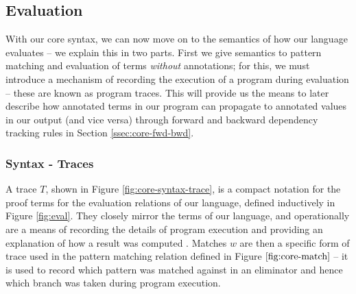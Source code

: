 \subsection{Evaluation}

With our core syntax, we can now move on to the semantics of how our language evaluates -- we explain this in two parts. First we give semantics to pattern matching and evaluation of terms \textit{without} annotations; for this, we must introduce a mechanism of recording the execution of a program during evaluation -- these are known as program traces. This will provide us the means to later describe how annotated terms in our program can propagate to annotated values in our output (and vice versa) through forward and backward dependency tracking rules in Section \ref{ssec:core-fwd-bwd}.

\subsubsection{Syntax - Traces}
\label{ssec:core-syntax-trace}



A trace $T$, shown in Figure \ref{fig:core-syntax-trace}, is a compact notation for the proof terms for the evaluation relations of our language, defined inductively in Figure \ref{fig:eval}. 
They closely mirror the terms of our language, and operationally are a means of recording the details of program execution and providing an explanation of how a result was computed \cite{perera12a}. Matches $w$ are then a specific form of trace used in the pattern matching relation defined in Figure $\ref{fig:core-match}$ -- it is used to record which pattern was matched against in an eliminator and hence which branch was taken during program execution. 




